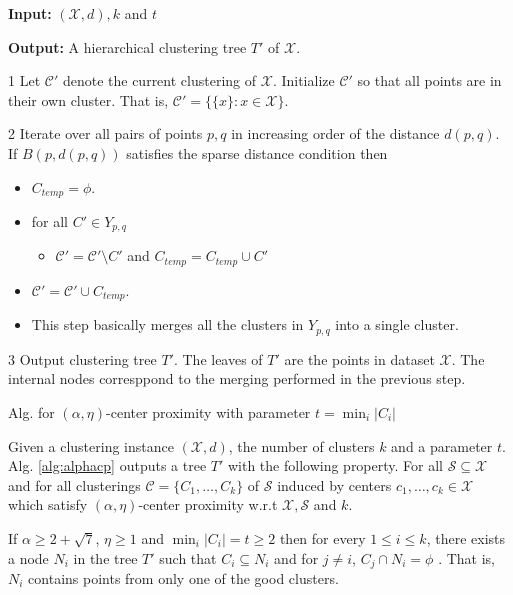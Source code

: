 \documentclass[11pt]{article}
\newcommand{\mc}{\mathcal}
\newenvironment{alg}{
    \begin{list}{}{
        \setlength{\itemsep}{2pt}
        \setlength{\parsep}{0pt}
        \setlength{\parskip}{0pt}
        \setlength{\topsep}{1pt}
    }
}
{
    \end{list}
}
\begin{document}
\begin{algorithm}[!ht]
\begin{alg}
	\item \textbf{Input: } $(\mc X, d), k$ and $t$
	\item \textbf{Output: } A hierarchical clustering tree $T'$ of $\mc X$.
	\item[1] Let $\mc C'$ denote the current clustering of $\mc X$. Initialize $\mc C'$ so that all points are in their own cluster. That is, $\mc C' = \{ \{x\}: x \in \mc X\}$.
	\item[2] Iterate over all pairs of points $p, q$ in increasing order of the distance $d(p, q)$. If $B(p, d(p, q))$ satisfies the sparse distance condition then
	\begin{itemize}
	\renewcommand\labelitemi{}
		\item $C_{temp} = \phi$. 
		\item for all $C' \in Y_{p,q}$
		\begin{itemize}
		\renewcommand\labelitemii{}
			\item $\mc C' = \mc C' \setminus C'$ and $C_{temp} = C_{temp} \cup C'$
		\end{itemize}
		\item $\mc C' = \mc C' \cup C_{temp}$.
		\item This step basically merges all the clusters in $Y_{p, q}$ into a single cluster.
	\end{itemize}
	\item[3] Output clustering tree $T'$. The leaves of $T'$ are the points in dataset $\mc X$. The internal nodes corresppond to the merging performed in the previous step.
\end{alg}
\caption{Alg. for $(\alpha, \eta)$-center proximity with parameter $t = \min_i |C_i|$}
\label{alg:alphacp}
\end{algorithm}


\begin{theorem}
Given a clustering instance $(\mc X, d)$, the number of clusters $k$ and a parameter $t$. Alg. \ref{alg:alphacp} outputs a tree $T'$ with the following property. For all $\mc S \subseteq \mc X$ and for all clusterings $\mc C = \{C_1, \ldots, C_k\}$ of $\mc S$ induced by centers $c_1, \ldots, c_k \in \mc X$ which satisfy $(\alpha, \eta)$-center proximity w.r.t $\mc X, \mc S$ and $k$. 

If $\alpha \ge 2 + \sqrt 7$, $\eta \ge 1$ and $ \min_i|C_i| = t \ge 2$ then for every $1\le i \le k$, there exists a node $N_i$ in the tree $T'$ such that $C_i \subseteq N_i$ and for $j \neq i$, $C_j \cap N_i = \phi$ . That is, $N_i$ contains points from only one of the good clusters. 
\end{theorem}
\end{document}
